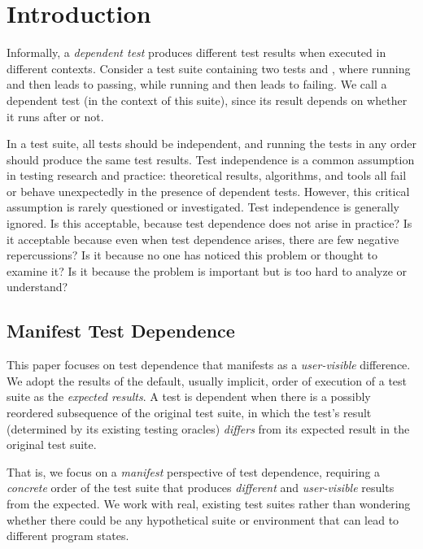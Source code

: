 \section{Introduction}


Informally, a \emph{dependent test} produces different test
results when executed in different contexts. Consider a test
suite containing two tests 
and , where running  and then  leads
to  passing, while running  and then
 leads to  failing. We call 
a dependent test (in the context of this suite), since its result depends on
whether it runs after  or not.


In a test suite, all tests should be independent, and
running the tests in any order should produce the same test results.
Test independence is a common assumption in testing research and practice:
theoretical results, algorithms, and tools all fail or behave unexpectedly
in the presence of dependent tests.
However, this critical assumption is rarely questioned or investigated. Test
independence is generally ignored.
Is this acceptable, because test dependence does
not arise in practice?
Is it acceptable because even when test dependence arises, there are few
negative repercussions?
Is it because no one has noticed this problem or thought to examine it?
Is it because the problem is important but is too hard to analyze or understand?

\subsection{Manifest Test Dependence}

This paper focuses on test dependence that manifests as a \textit{user-visible}
difference. We adopt the results of the default, usually
implicit, order of execution of a test suite as the
\textit{expected results}. A test is dependent when there is a possibly
reordered subsequence of the original test suite, in which
the test's result (determined by its existing testing
oracles) \textit{differs} from its expected result in the
original test suite.

That is, we focus on a \emph{manifest} perspective of test dependence,
requiring a \emph{concrete} order of the test suite that
produces \emph{different} and \emph{user-visible} results from the expected.  
%
We work with real, existing test suites rather than wondering
whether there could be any hypothetical suite 
or environment that can lead to different program states.

